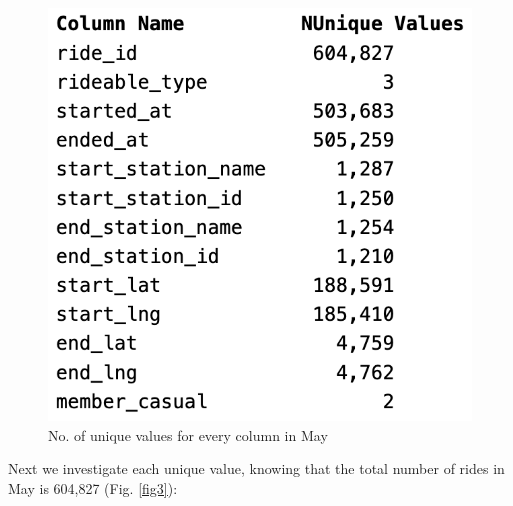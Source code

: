\documentclass[12pt]{article}
\begin{document}
	\begin{figure}[h]
	\centering
	\includegraphics[scale = 0.6]{imgUni.png} 
	\caption{No. of unique values for every column in May}
	\label{fig2}
	\end{figure}
	
Next we investigate each unique value, knowing that the total number of rides in May is 604,827  (Fig. \underline{\ref{fig3}}):
\end{document}
